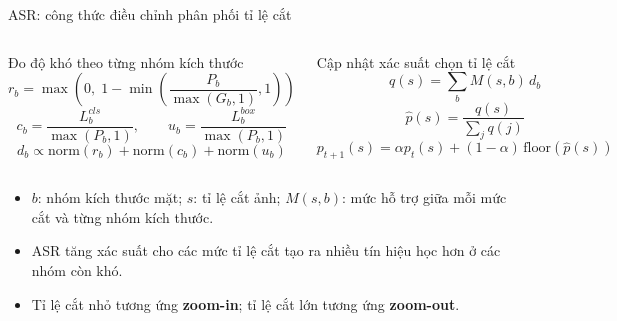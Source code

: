 \documentclass[aspectratio=169,11pt]{beamer}
\begin{document}
\begin{frame}{ASR: công thức điều chỉnh phân phối tỉ lệ cắt}
  \small
  \begin{columns}[T,onlytextwidth]
    \begin{block}{Đo độ khó theo từng nhóm kích thước}
    \[
      r_b=\max\!\left(0,\;1-\min\!\left(\frac{P_b}{\max(G_b,1)},1\right)\right)
    \]
    \[
      c_b=\frac{L^{cls}_b}{\max(P_b,1)},\qquad
      u_b=\frac{L^{box}_b}{\max(P_b,1)}
    \]
    \[
      d_b \propto \mathrm{norm}(r_b)+\mathrm{norm}(c_b)+\mathrm{norm}(u_b)
    \]
    \end{block}
    \begin{block}{Cập nhật xác suất chọn tỉ lệ cắt}
    \[
      q(s)=\sum_b M(s,b)\,d_b
    \]
    \[
      \hat p(s)=\frac{q(s)}{\sum_j q(j)}
    \]
    \[
      p_{t+1}(s)=\alpha p_t(s)+(1-\alpha)\,\mathrm{floor}(\hat p(s))
    \]
    \end{block}
  \end{columns}

  \vspace{0.15cm}
  \begin{itemize}
    \item \(b\): nhóm kích thước mặt; \(s\): tỉ lệ cắt ảnh; \(M(s,b)\): mức hỗ trợ giữa mỗi mức cắt và từng nhóm kích thước.
    \item ASR tăng xác suất cho các mức tỉ lệ cắt tạo ra nhiều tín hiệu học hơn ở các nhóm còn khó.
    \item Tỉ lệ cắt nhỏ tương ứng \textbf{zoom-in}; tỉ lệ cắt lớn tương ứng \textbf{zoom-out}.
  \end{itemize}
\end{frame}
\end{document}
